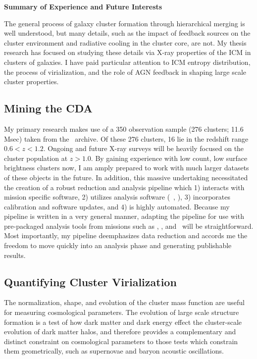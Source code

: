 \documentclass[11pt]{article}
\begin{document}
\begin{center}
\large
\textbf{Summary of Experience and Future Interests}
\normalsize
\end{center}

The general process of galaxy cluster formation through hierarchical
merging is well understood, but many details, such as the impact of
feedback sources on the cluster environment and radiative cooling in
the cluster core, are not. My thesis research has focused on studying
these details via X-ray properties of the ICM in clusters of
galaxies. I have paid particular attention to ICM entropy
distribution, the process of virialization, and the role of AGN
feedback in shaping large scale cluster properties.

\subsection*{Mining the CDA}

My primary research makes use of a 350 observation sample (276
clusters; 11.6 Msec) taken from the \chandra\ archive. Of these 276
clusters, 16 lie in the redshift range $0.6 < z < 1.2$. Ongoing and
future X-ray surveys will be heavily focused on the cluster population
at $z > 1.0$. By gaining experience with low count, low surface
brightness clusters now, I am amply prepared to work with much larger
datasets of these objects in the future. In addition, this massive
undertaking necessitated the creation of a robust reduction and
analysis pipeline which 1) interacts with mission specific software,
2) utilizes analysis software (\eg\ \xspec, \idl), 3)
incorporates calibration and software updates, and 4) is highly
automated. Because my pipeline is written in a very general manner,
adapting the pipeline for use with pre-packaged analysis tools from
missions such as \xmm, \spitzer, and \vla\ will be
straightforward. Most importantly, my pipeline deemphasizes data
reduction and accords me the freedom to move quickly into an analysis
phase and generating publishable results.

\subsection*{Quantifying Cluster Virialization}

The normalization, shape, and evolution of the cluster mass function
are useful for measuring cosmological parameters. The evolution of large
scale structure formation is a test of how dark matter and dark energy
effect the cluster-scale evolution of dark matter halos, and therefore
provides a complementary and distinct constraint on cosmological
parameters to those tests which constrain them geometrically,
such as supernovae and baryon acoustic oscillations.
\end{document}
